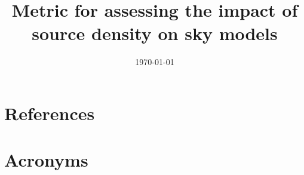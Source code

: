 \documentclass[modern]{aastex62}
\begin{document}

\date{\today}
\title{Metric for assessing the impact of source density on sky models}





\appendix
\section{References} \label{sec:bib}



\section{Acronyms} \label{sec:acronyms}

\end{document}
